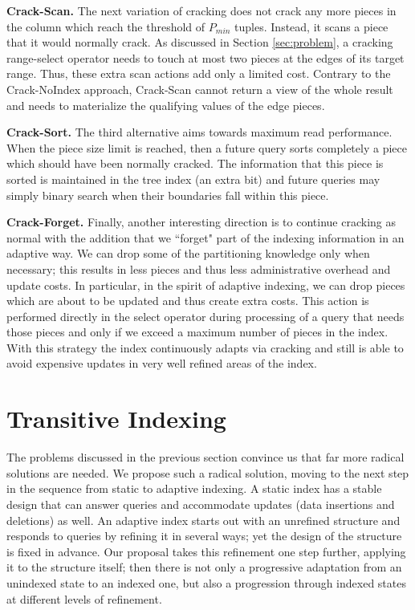 \documentclass{sig-alternate}
\begin{document}
\textbf{Crack-Scan.} The next variation of cracking does not crack any more pieces
in the column which reach  the threshold of $P_{min}$ tuples.
Instead, it scans a piece that it would normally crack.
As discussed in Section \ref{sec:problem}, a cracking range-select operator
needs to touch at most two pieces at the edges of its target range.
Thus, these extra scan actions add only a limited cost.
Contrary to the Crack-NoIndex approach,
Crack-Scan cannot return a view of the whole result and needs to materialize the qualifying values of the edge pieces.

\textbf{Crack-Sort.} The third alternative aims towards maximum read performance.
When the piece size limit is reached, then a future query sorts completely a piece which should have been normally cracked.
The information that this piece is sorted is maintained in the tree index (an extra bit)
and future queries may simply binary search when their boundaries fall within this piece.

\textbf{Crack-Forget.} Finally, another interesting direction is to continue cracking as normal
with the addition that we ``forget" part of the indexing information in an adaptive way.
We can drop some of the partitioning knowledge only when necessary; this results in less pieces and thus less
administrative overhead and update costs. In particular, in the spirit of adaptive indexing,
we can drop pieces which are about to be updated and thus create extra costs.
This action is performed directly in the select operator during processing of a query that needs those pieces
and only if we exceed a maximum number of pieces in the index. With this strategy the index continuously adapts
via cracking and still is able to avoid expensive updates in very well refined areas of the index.



\section{Transitive Indexing}\label{sec:trimmer}

The problems discussed in the previous section convince us that far more radical solutions are needed. We propose such a radical solution, moving to the next step in the sequence from static to adaptive indexing. A static index has a stable design that can answer queries and accommodate updates (data insertions and deletions) as well. An adaptive index starts out with an unrefined structure and responds to queries by refining it in several ways; yet the design of the structure is fixed in advance. Our proposal takes this refinement one step further, applying it to the structure itself; then there is not only a progressive adaptation from an unindexed state to an indexed one, but also a progression through indexed states at different levels of refinement.
\end{document}
